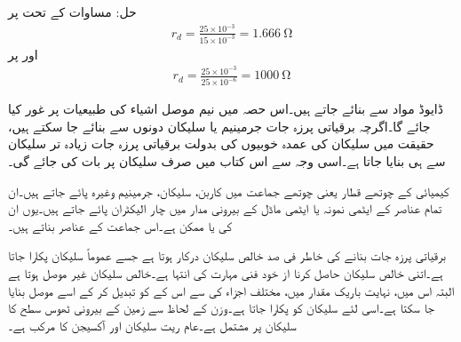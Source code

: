 حل:	مساوات   کے تحت  پر
\begin{align}
r_d =\frac{25 \times 10^{-3}}{15 \times 10^{-3}}=\SI{1.666}{\ohm}
\end{align}
اور  پر
\begin{align}
r_d =\frac{25 \times 10^{-3}}{25 \times 10^{-6}}=\SI{1000}{\ohm}
\end{align}

 ڈایوڈ  مواد سے بنائے جاتے ہیں۔اس حصہ میں نیم موصل اشیاء کی طبیعیات پر غور کیا جائے گا۔اگرچہ برقیاتی پرزہ جات جرمینیم یا سلیکان دونوں سے بنائے جا سکتے ہیں، حقیقت میں سلیکان کی عمدہ خوبیوں کی بدولت برقیاتی پرزہ جات زیادہ تر سلیکان سے ہی بنایا جاتا ہے۔اسی وجہ سے اس کتاب میں صرف سلیکان پر بات کی جائے گی۔

کیمیائی   کے چوتھے قطار یعنی چوتھے جماعت  میں کاربن، سلیکان، جرمینیم وغیرہ پائے جاتے ہیں۔ان تمام عناصر کے ایٹمی نمونہ یا ایٹمی ماڈل  کے بیرونی مدار میں چار الیکٹران  پائے جاتے ہیں۔یوں ان کی        یا  ممکن ہے۔اس جماعت کے عناصر   بناتے ہیں۔

برقیاتی پرزہ جات بنانے کی خاطر  فی صد خالص سلیکان درکار ہوتا ہے جسے عموماً  سلیکان پکارا جاتا ہے۔اتنی خالص سلیکان حاصل کرنا از خود فنی مہارت کی انتہا ہے۔خالص سلیکان غیر موصل ہوتا ہے البتہ اس میں، نہایت باریک مقدار میں، مختلف اجزاء کی   سے اس کے  کو تبدیل کر کے اسے موصل بنایا جا سکتا ہے۔اسی لئے سلیکان کو   پکارا جاتا ہے۔وزن کے لحاظ سے زمین کے بیرونی ٹھوس سطح کا  سلیکان پر مشتمل ہے۔عام ریت سلیکان اور آکسیجن کا مرکب  ہے۔

